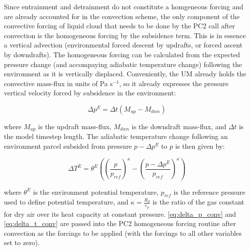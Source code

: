 \documentclass{UMDP_article}
\begin{document}
Since entrainment and detrainment do not constitute a homgeneous forcing
and are already accounted for in the convection scheme,
 the only component of the convective forcing of liquid cloud
that needs to be done by the PC2 call after convection is the homogeneous
forcing by the subsidence term.  This is in essence a vertical advection
(environmental forced descent by updrafts, or forced ascent by downdrafts).
The homogeneous forcing can be calculated from the expected pressure change
(and accompaying adiabatic temperature change) following the environment
as it is vertically displaced.
Conveniently, the UM already holds the convective mass-flux in units
of Pa s$^{-1}$, so it already expresses the pressure vertical velocity forced
by subsidence in the environment:

\begin{equation}
\Delta p^E = \Delta t \left( M_{up} - M_{dwn} \right)
\label{eq:delta_p_conv} \end{equation}

where $M_{up}$ is the updraft mass-flux, $M_{dwn}$ is the downdraft mass-flux,
and $\Delta t$ is the model timestep length.
The adiabatic temperature change following an environment parcel
subsided from pressure $p - \Delta p^E$ to $p$ is then given by:

\begin{equation}
\Delta T^E = \theta^E \left( \left(\frac{p}{p_{ref}}\right)^\kappa
                           - \left(\frac{p - \Delta p^E}{p_{ref}}\right)^\kappa
                      \right)
\label{eq:delta_t_conv} \end{equation}

where $\theta^E$ is the environment potential temperature,
$p_{ref}$ is the reference pressure used to define potential temperature,
and $\kappa = \frac{R_d}{c_p}$ is the ratio of the gas constant for dry air
over its heat capacity at constant pressure.
\ref{eq:delta_p_conv} and \ref{eq:delta_t_conv} are passed into the
PC2 homogeneous forcing routine after convection as the forcings
to be applied (with the forcings to all other variables set to zero).
\end{document}
